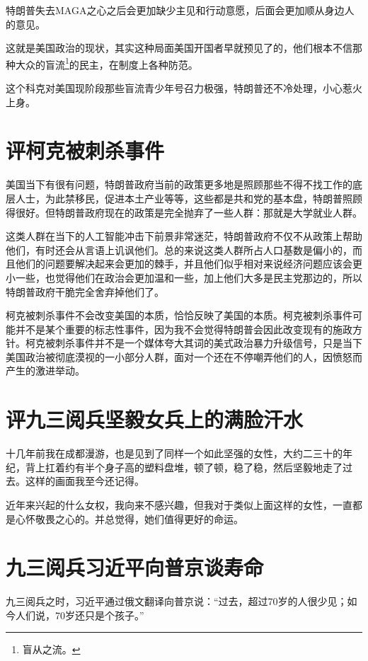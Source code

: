 \documentclass[12pt,oneside]{book}
\begin{document}
特朗普失去MAGA之心之后会更加缺少主见和行动意愿，后面会更加顺从身边人的意见。

这就是美国政治的现状，其实这种局面美国开国者早就预见了的，他们根本不信那种大众的盲流\footnote{盲从之流。}的民主，在制度上各种防范。

这个科克对美国现阶段那些盲流青少年号召力极强，特朗普还不冷处理，小心惹火上身。



\chapter{评柯克被刺杀事件}
美国当下有很有问题，特朗普政府当前的政策更多地是照顾那些不得不找工作的底层人士，为此禁移民，促进本土产业等等，这些都是共和党的基本盘，特朗普照顾得很好。但特朗普政府现在的政策是完全抛弃了一些人群：那就是大学就业人群。

这类人群在当下的人工智能冲击下前景非常迷茫，特朗普政府不仅不从政策上帮助他们，有时还会从言语上讥讽他们。总的来说这类人群所占人口基数是偏小的，而且他们的问题要解决起来会更加的棘手，并且他们似乎相对来说经济问题应该会更小一些，也觉得他们在政治会更加温和一些，加上他们大多是民主党那边的，所以特朗普政府干脆完全舍弃掉他们了。

柯克被刺杀事件不会改变美国的本质，恰恰反映了美国的本质。柯克被刺杀事件可能并不是某个重要的标志性事件，因为我不会觉得特朗普会因此改变现有的施政方针。柯克被刺杀事件并不是一个媒体夸大其词的美式政治暴力升级信号，只是当下美国政治被彻底漠视的一小部分人群，面对一个还在不停嘲弄他们的人，因愤怒而产生的激进举动。



\chapter{评九三阅兵坚毅女兵上的满脸汗水}
十几年前我在成都漫游，也是见到了同样一个如此坚强的女性，大约二三十的年纪，背上扛着约有半个身子高的塑料盘堆，顿了顿，稳了稳，然后坚毅地走了过去。这样的画面我至今还记得。

近年来兴起的什么女权，我向来不感兴趣，但我对于类似上面这样的女性，一直都是心怀敬畏之心的。并总觉得，她们值得更好的命运。




\chapter{九三阅兵习近平向普京谈寿命}
九三阅兵之时，习近平通过俄文翻译向普京说：“过去，超过70岁的人很少见；如今人们说，70岁还只是个孩子。”
\end{document}
